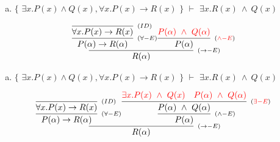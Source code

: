\documentclass[aspectratio=43]{beamer}
\begin{document}
    \begin{frame}[fragile]
    
    	\begin{enumerate}[d)]
			\item $\{$ $\exists x.P(x)\land Q(x), \forall x.P(x)\to R(x)$ $\}$ $\vdash$ $\exists x.R(x)\ \land\ Q(x) $\\
		\end{enumerate}
        
        \vspace{70pt}
        
        \[
        \begin{array}{c}
		
        	\infer[_{(\to -E)}]
            	{R(\alpha)}
            	{\infer[_{(\forall -E)}]
                	{P(\alpha) \rightarrow R(\alpha)} 
                    {\infer[_{(ID)}]
                    	{\forall x.P(x)\to R(x)}
                    	{}
                    }  
            	\infer[_{(\textcolor{red}{\land -E})}] 
                	{P(\alpha)}
                    {\textcolor{red}{P(\alpha)\ \land \ Q(\alpha)}}
                }
		\end{array}
        \]
        
	\end{frame}
    
    \begin{frame}[fragile]
    
    	\begin{enumerate}[d)]
			\item $\{$ $\exists x.P(x)\land Q(x), \forall x.P(x)\to R(x)$ $\}$ $\vdash$ $\exists x.R(x)\ \land\ Q(x) $\\
		\end{enumerate}
        
        \vspace{65pt}
        
        \[
        \begin{array}{c}
		
        	\infer[_{(\to -E)}]
            	{R(\alpha)}
            	{\infer[_{(\forall -E)}]
                	{P(\alpha) \rightarrow R(\alpha)} 
                    {\infer[_{(ID)}]
                    	{\forall x.P(x)\to R(x)}
                    	{}
                    }  
            	\infer[_{(\land -E)}] 
                	{P(\alpha)}
                    {\infer[_{(\textcolor{red}{\exists -E})}]
                    	{P(\alpha)\ \land \ Q(\alpha)}
                    	{\textcolor{red}{\exists x.P(x)\ \land \ Q(x)}
                        \hspace{10pt}
                        \textcolor{red}{P(\alpha)\ \land \ Q(\alpha)}
                        }
                    }
                }
		\end{array}
        \]
        
	\end{frame}
    
\end{document}
